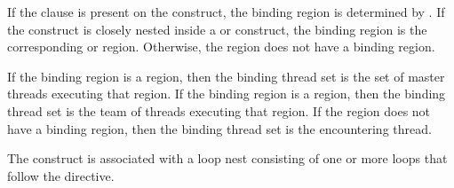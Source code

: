 
%

\binding

If the  clause is present on the construct, the binding region is
determined by . If the  construct is closely
nested inside a  or  construct, the binding region
is the corresponding  or  region. Otherwise, the
 region does not have a binding region.

If the binding region is a  region, then the binding thread set is
the set of master threads executing that region. If the binding region is a
 region, then the binding thread set is the team of threads
executing that region. If the  region does not have a binding
region, then the binding thread set is the encountering thread.



\descr

The  construct is associated with a loop nest consisting of
one or more loops that follow the directive. 

